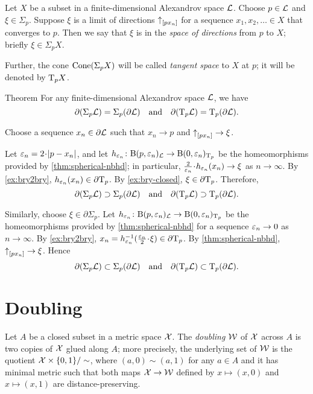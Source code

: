 Let $X$ be a subset in a finite-dimensional Alexandrov space $\mathcal{L}$.
Choose $p\in \mathcal{L}$ and $\xi\in \Sigma_p$.
Suppose $\xi$ is a limit of directions ${\uparrow}_{[{p}{x_n}]}$ for a sequence $x_1,x_2,\dots{}\in X$ that converges to $p$.
Then we say that $\xi$ is in the \emph{space of directions} from $p$ to $X$;
briefly $\xi\in\Sigma_pX$.

Further, the cone $\mathop{\rm Cone}\nolimits(\Sigma_pX)$ will be called \emph{tangent space} to $X$ at $p$;
it will be denoted by $\mathrm{T}_pX$.

\begin{thm}{Theorem}\label{thm:partial-Sigma}
For any finite-dimensional Alexandrov space $\mathcal{L}$, we have
\[\partial (\Sigma_p\mathcal{L})=\Sigma_p(\partial\mathcal{L})
\quad\text{and}\quad
\partial(\mathrm{T}_p\mathcal{L})=\mathrm{T}_p(\partial\mathcal{L}).\]
\end{thm}

Choose a sequence $x_n\in \partial \mathcal{L}$ such that $x_n\to p$ and ${\uparrow}_{[{p}{x_n}]}\to\xi$.

Let $\eps_n=2\cdot \dist{p}{x_n}{}$,
and let $h_{\varepsilon_n}\colon\mathrm{B}{}(p,\varepsilon_n)_{\mathcal{L}}\to \mathrm{B}{}(0,\varepsilon_n)_{\mathrm{T}_p}$ be the homeomorphisms provided by \ref{thm:spherical-nbhd};
in particular, $\tfrac2{\eps_n}\cdot h_{\eps_n}(x_n)\to \xi$ as $n\to\infty$.
By \ref{ex:bry2bry}, $h_{\varepsilon_n}(x_n)\in \partial \mathrm{T}_p$.
By \ref{ex:bry-closed}, $\xi\in \partial \mathrm{T}_p$.
Therefore,
\[\partial (\Sigma_p\mathcal{L})\supset\Sigma_p(\partial\mathcal{L})
\quad\text{and}\quad
\partial(\mathrm{T}_p\mathcal{L})\supset\mathrm{T}_p(\partial\mathcal{L}).\]

Similarly, choose $\xi\in\partial\Sigma_p$.
Let $h_{\varepsilon_n}\colon\mathrm{B}{}(p,\varepsilon_n)_{\mathcal{L}}\to \mathrm{B}{}(0,\varepsilon_n)_{\mathrm{T}_p}$ be the homeomorphisms provided by \ref{thm:spherical-nbhd} for a sequence $\varepsilon_n\to 0$ as $n\to\infty$.
By \ref{ex:bry2bry}, $x_n=h_{\eps_n}^{-1}(\tfrac{\eps_n}2\cdot\xi)\in \partial \T_p$.
By \ref{thm:spherical-nbhd}, ${\uparrow}_{[{p}{x_n}]}\to \xi$.
Hence
\[\partial (\Sigma_p\mathcal{L})\subset\Sigma_p(\partial\mathcal{L})
\quad\text{and}\quad\partial(\mathrm{T}_p\mathcal{L})\subset\mathrm{T}_p(\partial\mathcal{L}).\]
\qedsf

\section{Doubling}

Let $A$ be a closed subset in a metric space $\mathcal{X}$.
The \emph{doubling} $\mathcal{W}$ of $\mathcal{X}$ across $A$ is two copies of $\mathcal{X}$ glued along $A$;
more precisely, the underlying set of $\mathcal{W}$ is the quotient $\mathcal{X}\times\{0,1\}/\sim$, where $(a,0)\sim (a,1)$ for any $a\in A$ and it has minimal metric such that both maps $\mathcal{X}\to \mathcal{W}$ defined by $x\mapsto (x,0)$ and $x\mapsto (x,1)$ are distance-preserving.

